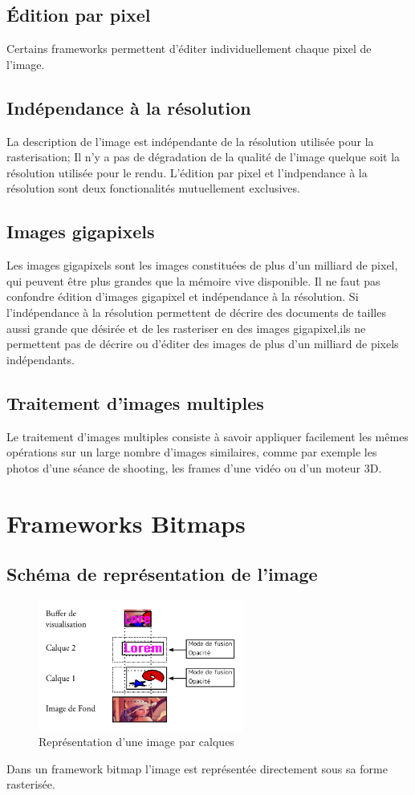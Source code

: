 		\subsection{Édition par pixel}
			Certains frameworks permettent d'éditer individuellement chaque pixel de l'image. 
		\subsection{Indépendance à la résolution}
			La description de l'image est indépendante de la résolution utilisée pour la rasterisation; Il n'y a pas de dégradation
			de la qualité de l'image quelque soit la résolution utilisée pour le rendu. L'édition par pixel et l'indpendance à la résolution
			sont deux fonctionalités mutuellement exclusives.
		\subsection{Images gigapixels}
			Les images gigapixels sont les images constituées de plus d'un milliard de pixel, qui peuvent être plus grandes que la mémoire
			vive disponible. Il ne faut pas confondre édition d'images gigapixel et indépendance à la résolution.
			Si l'indépendance à la résolution permettent de décrire des documents de tailles aussi grande
			que désirée et de les rasteriser en des images gigapixel,ils ne permettent pas de décrire ou d'éditer des images
			de plus d'un milliard de pixels indépendants. 

		\subsection{Traitement d'images multiples}
			Le traitement d'images multiples consiste à savoir appliquer facilement les mêmes opérations sur un large nombre d'images similaires, 
			comme par exemple les photos d'une séance de shooting, les frames d'une vidéo ou d'un moteur 3D.

	\section{Frameworks Bitmaps}
		\subsection{Schéma de représentation de l'image}
			\begin{figure}[h]
				\centering
				\includegraphics[width=0.6\textwidth]{images/calques}
				\caption{Représentation d'une image par calques}
				\label{fig:editbitmap}
			\end{figure}
			Dans un framework bitmap l'image est représentée directement sous sa forme rasterisée. 
			
